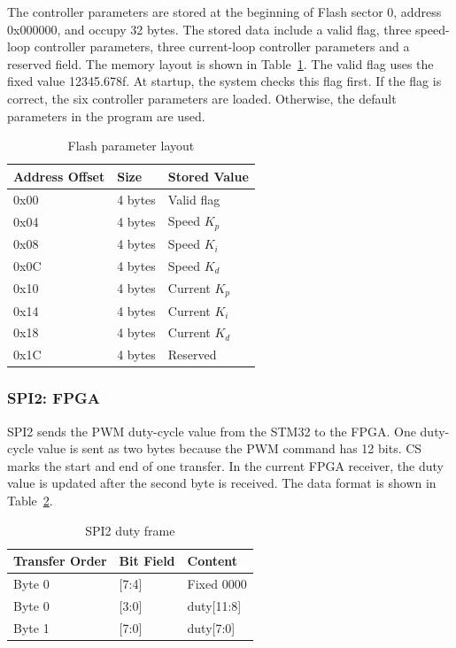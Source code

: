 \documentclass[12pt, a4paper]{report}
\begin{document}
The controller parameters are stored at the beginning of Flash sector 0, address 0x000000, and occupy 32 bytes. The stored data include a valid flag, three speed-loop controller parameters, three current-loop controller parameters and a reserved field. The memory layout is shown in Table~\ref{tab:flash_param_layout}. The valid flag uses the fixed value 12345.678f. At startup, the system checks this flag first. If the flag is correct, the six controller parameters are loaded. Otherwise, the default parameters in the program are used.

\begin{table}[H]
\centering
\caption{Flash parameter layout}
\label{tab:flash_param_layout}
\small
\begin{tabular}{@{}p{}p{}p{}@{}}
\toprule
Address Offset & Size & Stored Value \\
\midrule
0x00 & 4 bytes & Valid flag \\
0x04 & 4 bytes & Speed \(K_p\) \\
0x08 & 4 bytes & Speed \(K_i\) \\
0x0C & 4 bytes & Speed \(K_d\) \\
0x10 & 4 bytes & Current \(K_p\) \\
0x14 & 4 bytes & Current \(K_i\) \\
0x18 & 4 bytes & Current \(K_d\) \\
0x1C & 4 bytes & Reserved \\
\bottomrule
\end{tabular}
\end{table}


\subsubsection{SPI2: FPGA}

SPI2 sends the PWM duty-cycle value from the STM32 to the FPGA. One duty-cycle value is sent as two bytes because the PWM command has 12 bits. CS marks the start and end of one transfer. In the current FPGA receiver, the duty value is updated after the second byte is received. The data format is shown in Table~\ref{tab:spi2_frame}.

\begin{table}[H]
\centering
\caption{SPI2 duty frame}
\label{tab:spi2_frame}
\small
\begin{tabular}{@{}p{}p{}p{}@{}}
\toprule
Transfer Order & Bit Field & Content \\
\midrule
Byte 0 & [7:4] & Fixed 0000 \\
Byte 0 & [3:0] & duty[11:8] \\
Byte 1 & [7:0] & duty[7:0] \\
\bottomrule
\end{tabular}
\end{table}
\end{document}
